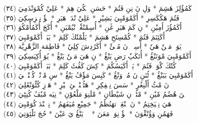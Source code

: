 \documentclass[a4paper, 10pt]{report}
\begin{document}
\begin{center}
\textarabic{(٣٤) \textcolor{mygreen}{كَمُؤُلِزَ هَشِمَ  * وَلِ نَ نِنِ فَتُمَ  * حَسَنِ مٖكُيَ هِمَ  * عَلِيْ كُمْوَنْدَمِيَ }} 
\\[5mm] 

\textarabic{(٣٥) \textcolor{mygreen}{فَتُمَ هَكُكَسِرِ  * أَكَمْوَمْبِيَ بَشِيْرِ  * عَلِيْ نْدَكٖ هَبَرِ  * يٖؤٗ نِمٖزِسِكِيَ }} 
\\[5mm] 

\textarabic{(٣٦) \textcolor{mygreen}{أَكَمُؤُزَ أَمِيْنِ  * نِ كَمَ هَبَرِ ڠَنِ  * أُسِمْنْڠٗجٖ نْيُمْبَنِ  * أُكَجَ أُكَمُأَمْكُوَ }} 
\\[5mm] 

\textarabic{(٣٧) \textcolor{mygreen}{أَكَئِنَمَ فَتُمَ  * كُمْسِتَحِ هَشِمَ  * يَلٗمْتٗكَ كَلِمَ  * بَبَكٖ أَكَمْوَمْبِيَ }} 
\\[5mm] 

\textarabic{(٣٨) \textcolor{mygreen}{يَوَتٖ مَنٖنٗ هَيٗ  * أُسِٹٖٹٖ نَ مُمٖئٗ  * أَكَرُدِشَ كِلِيٗ  * فَاطِمَة الزَّهْرِيَّة }} 
\\[5mm] 

\textarabic{(٣٩) \textcolor{mygreen}{أَكَمْوَمْبِيَ مْوَنَنْڠُ  * أُتَكَپٗ رَضِ يَنْڠُ  * نِ هَيَ مَنٖنٗ يَنْڠُ  * يُوَ أُكِيَسِكِيَ }} 
\\[5mm] 

\textarabic{(٤٠) \textcolor{mygreen}{كُتٗكَ كْوَكٖ فَتُمَ  * يَلٖ أَكَيَسُكُمَ  * كِشَ كَڤُٹَ كَلِمَ  * بَبَكٖ أَكَمْوَمْبِيَ }} 
\\[5mm] 

\textarabic{(٤١) \textcolor{mygreen}{أَكَمْوَمْبِيَ بَبَنْڠُ  * ٹُنَنِ نَ مُمٖ وَنْڠُ  * كَبِسَ مَؤٗڤُ يَنْڠُ  * سِ مْوٖنْيٖ كُپٖنْدٖلٖيَ }} 
\\[5mm] 

\textarabic{(٤٢) \textcolor{mygreen}{نَ مْٹُ أَلٗنِغُرِ  * سَسَ نِمٖفِكِرِ  * هَٹُپٖنْدٖلٖئِ خٖيْرِ  * هَوٖزِ كُٹْوَنْڠَلِيَ }} 
\\[5mm] 

\textarabic{(٤٣) \textcolor{mygreen}{تٖنَ هُضُمُ مٗيٗنِ  * مْٹُيٖ نِ شَيْطَانِ  * مْلَنِوَ مَلْعُوْنِ  * نِيَه مْبٗڤُ كُنِٹِيَ }} 
\\[5mm] 

\textarabic{(٤٤) \textcolor{mygreen}{هَيَ نِمٖيَخِتِمُ  * نَ مٖنْڠِنٖ تهَنُظُمُ  * جَمِيْعِ مُيَفَهَمُ  * نِمٖپٖنْدَ كُوَمْبِيَ }} 
\\[5mm] 

\textarabic{(٤٥) \textcolor{mygreen}{فَهَمُنِ وَؤُنْڠْوَنَ  * يٖؤٗ نِوَپٖ مَعَنَ  * پٖٹٖ يَنْڠُ يَ عَيْنَ  * حُجَ نَلٗئِوَتِيَ }} 
\\[5mm] 


\end{center}
\end{document}
